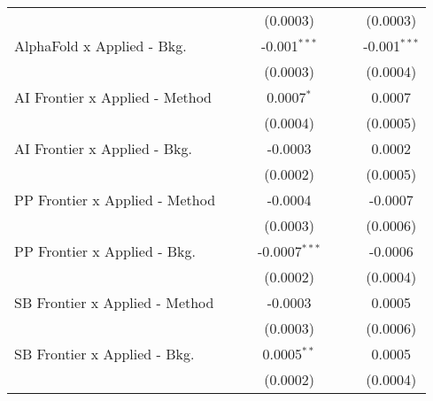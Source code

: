 \begin{tabular}{lcccccc}
                                  &                 &                 & (0.0003)        &                 &                & (0.0003)\\   
   AlphaFold x Applied - Bkg.     &                 &                 & -0.001$^{***}$  &                 &                & -0.001$^{***}$\\   
                                  &                 &                 & (0.0003)        &                 &                & (0.0004)\\   
   AI Frontier x Applied - Method &                 &                 & 0.0007$^{*}$    &                 &                & 0.0007\\   
                                  &                 &                 & (0.0004)        &                 &                & (0.0005)\\   
   AI Frontier x Applied - Bkg.   &                 &                 & -0.0003         &                 &                & 0.0002\\   
                                  &                 &                 & (0.0002)        &                 &                & (0.0005)\\   
   PP Frontier x Applied - Method &                 &                 & -0.0004         &                 &                & -0.0007\\   
                                  &                 &                 & (0.0003)        &                 &                & (0.0006)\\   
   PP Frontier x Applied - Bkg.   &                 &                 & -0.0007$^{***}$ &                 &                & -0.0006\\   
                                  &                 &                 & (0.0002)        &                 &                & (0.0004)\\   
   SB Frontier x Applied - Method &                 &                 & -0.0003         &                 &                & 0.0005\\   
                                  &                 &                 & (0.0003)        &                 &                & (0.0006)\\   
   SB Frontier x Applied - Bkg.   &                 &                 & 0.0005$^{**}$   &                 &                & 0.0005\\   
                                  &                 &                 & (0.0002)        &                 &                & (0.0004)\\   

\end{tabular}
